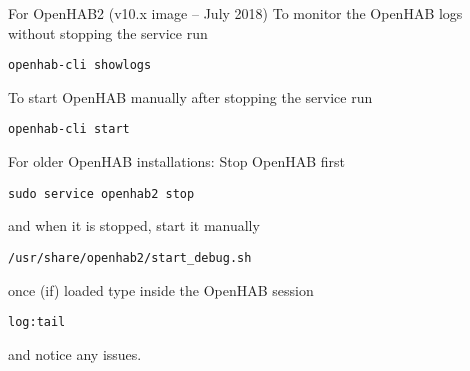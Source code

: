 For OpenHAB2 (v10.x image -- July 2018)
To monitor the OpenHAB logs without stopping the service run

\texttt{openhab-cli showlogs}

To start OpenHAB manually after stopping the service run

\texttt{openhab-cli start}

For older OpenHAB installations:
Stop OpenHAB first

\texttt{sudo service openhab2 stop}

and when it is stopped, start it manually

\texttt{/usr/share/openhab2/start\_debug.sh}

once (if) loaded type inside the OpenHAB session

\texttt{log:tail}

and notice any issues.
